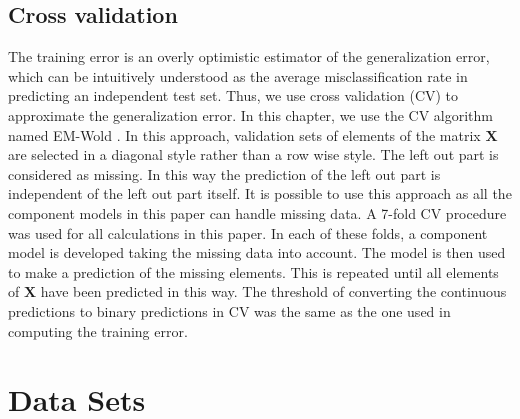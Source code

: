 \subsection{Cross validation}
The training error is an overly optimistic estimator of the generalization error, which can be intuitively understood as the average misclassification rate in predicting an independent test set. Thus, we use cross validation (CV) to approximate the generalization error. In this chapter, we use the CV algorithm named EM-Wold \cite{wold1978cross,Bro2008}. In this approach, validation sets of elements of the matrix $\mathbf{X}$ are selected in a diagonal style rather than a row wise style. The left out part is considered as missing. In this way the prediction of the left out part is independent of the left out part itself. It is possible to use this approach as all the component models in this paper can handle missing data. A 7-fold CV procedure was used for all calculations in this paper. In each of these folds, a component model is developed taking the missing data into account. The model is then used to make a prediction of the missing elements. This is repeated until all elements of $\mathbf{X}$ have been predicted in this way. The threshold of converting the continuous predictions to binary predictions in CV was the same as the one used in computing the training error.

\section{Data Sets}
